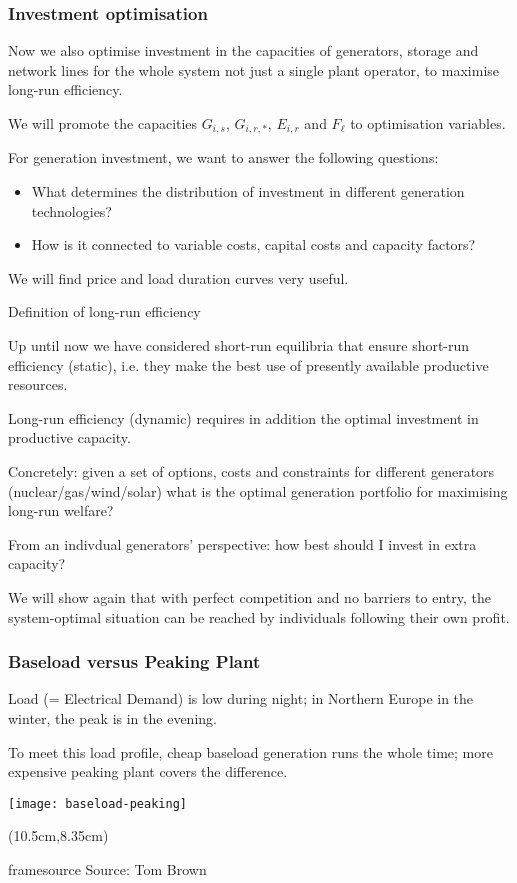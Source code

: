 \documentclass[10pt,aspectratio=169,dvipsnames]{beamer}
\newcommand{\source}[1]{\begin{textblock*}{5cm}(10.5cm,8.35cm)
    \begin{beamercolorbox}[ht=0.5cm,right]{framesource}
        \usebeamerfont{framesource}\usebeamercolor[fg]{framesource} Source: {#1}
    \end{beamercolorbox}
\end{textblock*}}
\let\olditem\item
\renewcommand{\item}{%
\olditem\vspace{5pt}}
\begin{document}
\begin{frame}[fragile]
  \frametitle{Investment optimisation}

 Now we also optimise \alert{investment} in the \alert{capacities} of generators,
  storage and network lines for the \alert{whole system} not just a single plant operator, to maximise \alert{long-run efficiency}.

  We will promote the capacities $G_{i,s}$, $G_{i,r,*}$, $E_{i,r}$ and
  $F_{\ell}$ to optimisation variables.

  For generation investment, we want to answer the following questions:
  \begin{itemize}
    \item What determines the distribution of investment in different generation technologies?
    \item How is it connected to variable costs, capital costs and capacity factors?
  \end{itemize}

  We will find price and load duration curves very useful.
\end{frame}


\begin{frame}{Definition of long-run efficiency}

  Up until now we have considered \alert{short-run} equilibria that
  ensure \alert{short-run} efficiency (static), i.e. they make the best use of
  presently available productive resources.

  \alert{Long-run} efficiency (dynamic) requires in addition the optimal
  investment in productive capacity.

  Concretely: given a set of options, costs and constraints for different
  generators (nuclear/gas/wind/solar) what is the optimal generation
  portfolio for maximising long-run welfare?

  From an indivdual generators' perspective: how best should I invest in extra capacity?

  We will show again that with perfect competition and no barriers to
  entry, the system-optimal situation can be reached by individuals
  following their own profit.

\end{frame}



\begin{frame}
  \frametitle{Baseload versus Peaking Plant}

  \alert{Load} (= Electrical Demand) is low during night; in Northern Europe in the winter, the peak is in the evening.

  To meet this load profile, cheap \alert{baseload} generation runs the whole time; more expensive \alert{peaking plant} covers the difference.

  \centering
  \texttt{[image: baseload-peaking]}

  \source{Tom Brown}

\end{frame}
\end{document}
